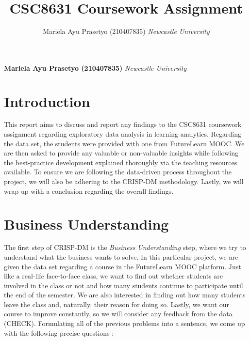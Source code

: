 \documentclass[12pt,]{article}
\title{CSC8631 Coursework Assignment  }
\author{\Large Mariela Ayu Prasetyo
(210407835)\vspace{0.05in} \newline\normalsize\emph{Newcastle
University}  }
\date{}
\newcommand*{\authorfont}{\fontfamily{phv}\selectfont}
\begin{document}
	
%    


{%
\setlength{\parindent}{0pt}
\thispagestyle{plain}
{\fontsize{18}{20}\selectfont\raggedright 
\maketitle  %

}

{
   \vskip 13.5pt\relax \normalsize\fontsize{11}{12} 
\textbf{\authorfont Mariela Ayu Prasetyo
(210407835)} \hskip 15pt \emph{\small Newcastle University}   

}

}






\vskip -8.5pt



\noindent  

\hypertarget{introduction}{%
\section{Introduction}\label{introduction}}

This report aims to discuss and report any findings to the CSC8631
coursework assignment regarding exploratory data analysis in learning
analytics. Regarding the data set, the students were provided with one
from FutureLearn MOOC. We are then asked to provide any valuable or
non-valuable insights while following the best-practice development
explained thoroughly via the teaching resources available. To ensure we
are following the data-driven process throughout the project, we will
also be adhering to the CRISP-DM methodology. Lastly, we will wrap up
with a conclusion regarding the overall findings.

\hypertarget{business-understanding}{%
\section{Business Understanding}\label{business-understanding}}

The first step of CRISP-DM is the \emph{Business Understanding} step,
where we try to understand what the business wants to solve. In this
particular project, we are given the data set regarding a course in the
FutureLearn MOOC platform. Just like a real-life face-to-face class, we
want to find out whether students are involved in the class or not and
how many students continue to participate until the end of the semester.
We are also interested in finding out how many students leave the class
and, naturally, their reason for doing so. Lastly, we want our course to
improve constantly, so we will consider any feedback from the data
(CHECK). Formulating all of the previous problems into a sentence, we
come up with the following precise questions :
\end{document}
